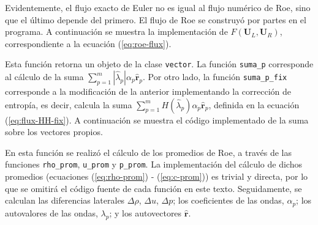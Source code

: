 Evidentemente, el flujo exacto de Euler no es igual al flujo numérico de Roe, sino que el último depende del primero. El flujo de Roe se construyó  por partes en el programa. A continuación se muestra la implementación de $F(\mathbf{{U}}_L, \mathbf{{U}}_R)$, correspondiente a la ecuación (\ref{eq:roe-flux}).

Esta función retorna un objeto de la clase \texttt{vector}. La función \texttt{suma\_p} corresponde al cálculo de la suma $\sum_{p=1}^{m}|\hat{\lambda}_{p}|\alpha_{p}\mathbf{\hat{r}}_{p}$. Por otro lado, la función \texttt{suma\_p\_fix} corresponde a la modificación de la anterior implementando la corrección de entropía, es decir, calcula la suma $\sum_{p=1}^{m}H(\hat{\lambda}_{p})\alpha_{p}\mathbf{\hat{r}}_{p}$, definida en la ecuación (\ref{eq:flux-HH-fix}). A continuación se muestra el código implementado de la suma sobre los vectores propios.

En esta función se realizó el cálculo de los promedios de Roe, a través de las funciones \texttt{rho\_prom}, \texttt{u\_prom} y \texttt{p\_prom}. La implementación del cálculo de dichos promedios (ecuaciones (\ref{eq:rho-prom}) - (\ref{eq:c-prom})) es trivial y directa, por lo que se omitirá el código fuente de cada función en este texto. Seguidamente, se calculan las diferencias laterales $\Delta \rho$, $\Delta u$, $\Delta p$; los coeficientes de las ondas, $\alpha_{p}$; los autovalores de las ondas, $\lambda_{p}$; y los autovectores $\mathbf{\hat{r}}$.

